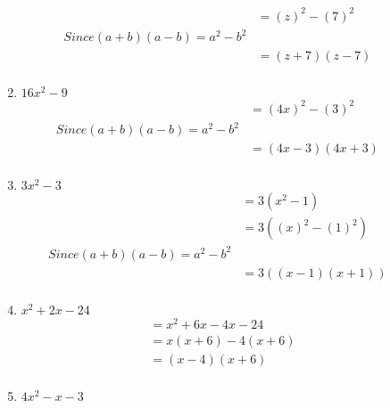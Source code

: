 \documentclass{article}
\begin{document}
\begin{description}
\begin{enumerate}
\begin{equation}
                      \begin{split}
                          & = (z)^2 - (7)^2\\
                          Since (a+b)(a-b) = a^2 - b^2 \\
                          & = (z+7)(z-7)\\
                      \end{split}
                  \end{equation}
            \item $ 16x^2 - 9 $
                  \begin{equation}
                      \begin{split}
                          & = (4x)^2 - (3)^2 \\
                          Since (a+b)(a-b) = a^2 - b^2 \\
                          & = (4x - 3)(4x+3)\\
                      \end{split}
                  \end{equation}
            \item $ 3x^2 - 3 $
                  \begin{equation}
                      \begin{split}
                          & = 3(x^2-1)\\
                          & = 3((x)^2-(1)^2)\\
                          Since (a+b)(a-b) = a^2 - b^2 \\
                          & = 3((x-1)(x+1))\\
                      \end{split}
                  \end{equation}
            \item $ x^2 + 2x - 24 $
                  \begin{equation}
                      \begin{split}
                          & = x^2 + 6x - 4x - 24\\
                          & = x(x+6)-4(x + 6)\\
                          & = (x-4)(x+6)\\
                      \end{split}
                  \end{equation}
            \item $ 4x^2 - x - 3 $
                  \begin{equation}

\end{equation}
\end{enumerate}
\end{description}
\end{document}
